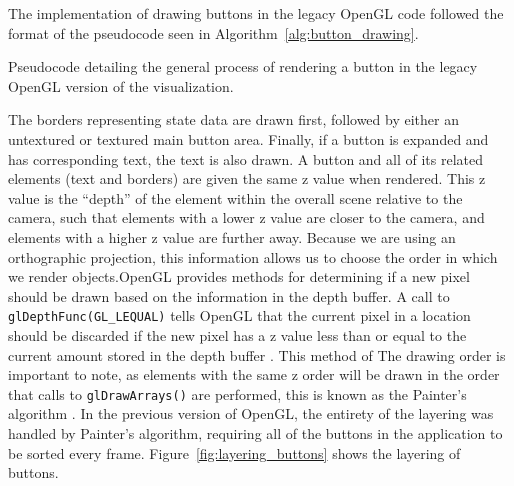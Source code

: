 The implementation of drawing buttons in the legacy OpenGL code followed the format of the 
pseudocode seen in Algorithm~\ref{alg:button_drawing}.

\begin{algorithm}
    \caption{Pseudocode detailing the general process of rendering a button in the legacy OpenGL
    version of the visualization.}\label{alg:button_drawing}
    \begin{algorithmic}[1]
                \State{}
                        \State{}
                    \Else
                        \State{}
                    \EndIf
                \Else
                    \State{}
                        \State{}
                    \Else
                        \State{}
                    \EndIf
                        \State{}
                    \EndIf
                \EndIf
            \EndFor
        \EndFunction
    \end{algorithmic}
\end{algorithm}

The borders representing state data are drawn first, followed by either an untextured or textured 
main button area. Finally, if a button is expanded and has corresponding text, the text is 
also drawn. A button and all of its related elements (text and borders) are given the same z value when rendered. This z value is the ``depth'' of the element within the overall scene relative to the camera, such that elements with a lower z value are closer to the camera, and elements with a higher z value are further away. Because we are using an orthographic projection, this information allows us to choose the order in which we render objects.OpenGL provides methods for determining if a
new pixel should be drawn based on the information in the depth buffer. A call to {\tt glDepthFunc(GL\_LEQUAL)} tells OpenGL that the current pixel in a location should be discarded if the new pixel has a z value less than or equal to the current amount stored in the depth buffer \cite{opengl_depth_buffer}. This method of The drawing order is important to note, as elements with the same z order will be drawn in the order that calls to {\tt glDrawArrays()} are performed, this is known
as the Painter's algorithm \cite{Berg1993}. In the previous version of OpenGL, the entirety of the layering was handled by Painter's algorithm, requiring all of the buttons in the application to be sorted every frame. Figure~\ref{fig:layering_buttons} shows the layering of buttons.

